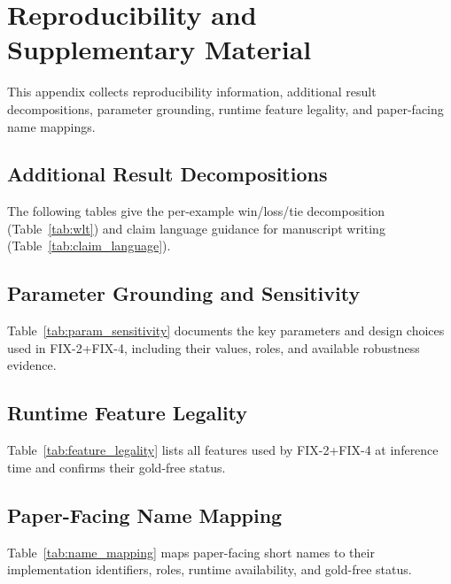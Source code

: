 \appendix
\section{Reproducibility and Supplementary Material}
\label{sec:appendix_repro}
This appendix collects reproducibility information, additional result decompositions,
parameter grounding, runtime feature legality, and paper-facing name mappings.



\clearpage
\subsection*{Additional Result Decompositions}

The following tables give the per-example win/loss/tie decomposition
(Table~\ref{tab:wlt}) and claim language guidance for manuscript writing
(Table~\ref{tab:claim_language}).




\clearpage
\subsection*{Parameter Grounding and Sensitivity}

Table~\ref{tab:param_sensitivity} documents the key parameters and design choices
used in FIX-2+FIX-4, including their values, roles, and available robustness evidence.



\clearpage
\subsection*{Runtime Feature Legality}

Table~\ref{tab:feature_legality} lists all features used by FIX-2+FIX-4 at
inference time and confirms their gold-free status.



\clearpage
\subsection*{Paper-Facing Name Mapping}

Table~\ref{tab:name_mapping} maps paper-facing short names to their
implementation identifiers, roles, runtime availability, and gold-free status.

